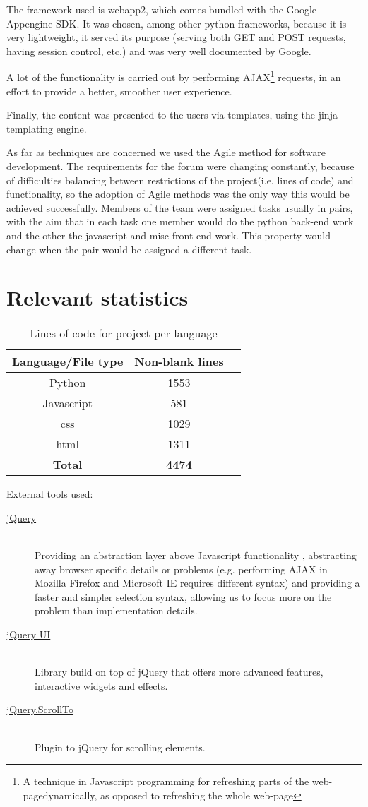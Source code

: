 \documentclass[12pt,a4paper,titlepage]{article}
\begin{document}
The framework used is webapp2, which comes bundled with the Google Appengine SDK. It was chosen, among other python frameworks, because it is very lightweight, it served its purpose (serving both GET and POST requests, having session control, etc.) and was very well documented by Google. 

A lot of the functionality is carried out by performing AJAX\footnote{A technique in Javascript programming for refreshing parts of the web-pagedynamically, as opposed to refreshing the whole web-page}  requests, in an effort to provide a better, smoother user experience.

Finally, the content was presented to the users via templates, using the jinja templating engine.

As far as techniques are concerned we used the Agile method for software development. The requirements for the forum were changing constantly, because of difficulties balancing between restrictions of the project(i.e. lines of code) and functionality, so the adoption of Agile methods was the only way this would be achieved successfully. Members of the team were assigned tasks usually in pairs, with the aim that in each task one member would do the python back-end work and the other the javascript and misc front-end work. This property would change when the pair would be assigned a different task.
\section{Relevant statistics}
\begin{table}[!htbp]
\centering
\begin{tabular}{| c |c |c|}
\hline
\bf{Language/File type} & \bf{Non-blank lines}\\
\hline
Python & 1553\\
\hline
Javascript & 581 \\
\hline
css & 1029 \\
\hline
html & 1311\\
\hline
\bf{Total} & \bf{4474}\\
\hline
\end{tabular}
\caption{Lines of code for project per language}
\end{table}
External tools used:
\begin{description}
\item[\href{http://jquery.com/}{jQuery}]\hfill\\
Providing an abstraction layer above Javascript functionality , abstracting away browser specific details or problems (e.g. performing AJAX in Mozilla Firefox and Microsoft IE requires different syntax) and providing a faster and simpler selection syntax, allowing us to focus more on the problem than implementation details.
\item[\href{http://jqueryui.com/}{jQuery UI}]\hfill\\
Library build on top of jQuery that offers more advanced features, interactive widgets and effects.
\item[\href{http://flesler.blogspot.co.uk/2007/10/jqueryscrollto.html}{jQuery.ScrollTo}]\hfill\\
Plugin to jQuery for scrolling elements.
\end{description}
\newpage
\end{document}
